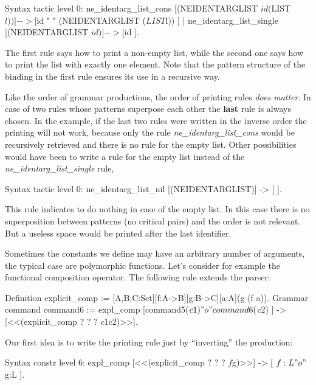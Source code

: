 \begin{coq_example}
Syntax tactic level 0:
  ne_identarg_list_cons [(NEIDENTARGLIST $id ($LIST $l))]
                            -> [ $id " " (NEIDENTARGLIST ($LIST $l)) ]
| ne_identarg_list_single [(NEIDENTARGLIST $id)] -> [ $id ].
\end{coq_example}


The first rule says how to print a non-empty list, while the second
one says how to print the list with exactly one element. Note that the
pattern structure of the binding in the first rule ensures its use in
a recursive way.

Like the order of grammar productions, the order of printing rules
\emph{does matter}. In case of two rules whose patterns superpose
each other the {\bf last} rule is always chosen.  In the example, if
the last two rules were written in the inverse order the printing will
not work, because only the rule {\sl ne\_identarg\_list\_cons} would
be recursively retrieved and there is no rule for the empty list.
Other possibilities would have been to write a rule for the empty list
instead of the {\sl ne\_identarg\_list\_single} rule,

\begin{coq_example}
Syntax tactic level 0:
  ne_identarg_list_nil [(NEIDENTARGLIST)] -> [ ].
\end{coq_example}

This rule indicates to do nothing in case of the empty list.  In this
case there is no superposition between patterns (no critical pairs)
and the order is not relevant. But a useless space would be printed
after the last identifier.


Sometimes the constants we define may have an arbitrary number of
arguments, the typical case are polymorphic functions. Let's consider
for example the functional composition operator. The following rule
extends the parser:

\begin{coq_example*}
Definition explicit_comp := [A,B,C:Set][f:A->B][g:B->C][a:A](g (f a)).
Grammar command command6 :=
  expl_comp [command5($c1) "o" command6($c2) ] ->
            [<<(explicit_comp ? ? ? $c1 $c2)>>].
\end{coq_example*}

Our first idea is to write the printing rule just by ``inverting'' the
production:

\begin{coq_example} 
Syntax constr level 6:
  expl_comp [<<(explicit_comp ? ? ? $f $g)>>] -> [ $f:L "o" $g:L ].
\end{coq_example}

